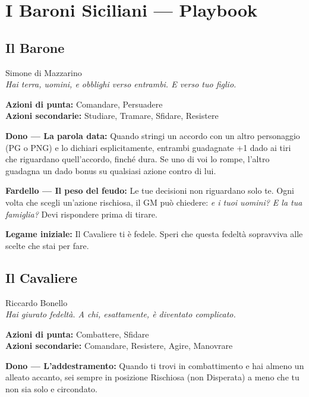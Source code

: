\section{I Baroni Siciliani — Playbook}

\subsection{Il Barone}
{\cinzel\footnotesize\color{grigionote} Simone di Mazzarino}\\
\textit{Hai terra, uomini, e obblighi verso entrambi. E verso tuo figlio.}

\textbf{Azioni di punta:} Comandare, Persuadere\\
\textbf{Azioni secondarie:} Studiare, Tramare, Sfidare, Resistere

\textbf{Dono — La parola data:} Quando stringi un accordo con un altro
personaggio (PG o PNG) e lo dichiari esplicitamente, entrambi
guadagnate +1 dado ai tiri che riguardano quell'accordo, finché
dura. Se uno di voi lo rompe, l'altro guadagna un dado bonus su
qualsiasi azione contro di lui.

\textbf{Fardello — Il peso del feudo:} Le tue decisioni non riguardano
solo te. Ogni volta che scegli un'azione rischiosa, il GM può
chiedere: \textit{e i tuoi uomini? E la tua famiglia?} Devi
rispondere prima di tirare.

\textbf{Legame iniziale:} Il Cavaliere ti è fedele. Speri che questa
fedeltà sopravviva alle scelte che stai per fare.

\filetto

\subsection{Il Cavaliere}
{\cinzel\footnotesize\color{grigionote} Riccardo Bonello}\\
\textit{Hai giurato fedeltà. A chi, esattamente, è diventato complicato.}

\textbf{Azioni di punta:} Combattere, Sfidare\\
\textbf{Azioni secondarie:} Comandare, Resistere, Agire, Manovrare

\textbf{Dono — L'addestramento:} Quando ti trovi in combattimento
e hai almeno un alleato accanto, sei sempre in posizione Rischiosa
(non Disperata) a meno che tu non sia solo e circondato.

